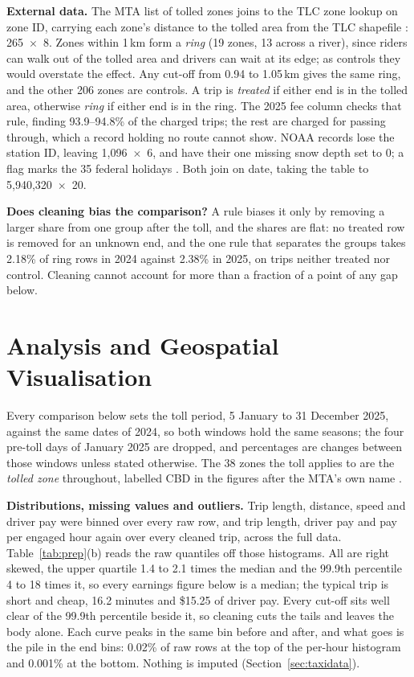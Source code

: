 \documentclass[11pt]{article}
\begin{document}
\textbf{External data.} The MTA list of tolled zones \cite{mtacbdzones} joins to the TLC zone lookup on zone ID, carrying each zone's distance to the tolled area from the TLC shapefile \cite{tlczones}: 265~$\times$~8. Zones within 1\,km form a \emph{ring} (19 zones, 13 across a river), since riders can walk out of the tolled area and drivers can wait at its edge; as controls they would overstate the effect. Any cut-off from 0.94 to 1.05\,km gives the same ring, and the other 206 zones are controls. A trip is \emph{treated} if either end is in the tolled area, otherwise \emph{ring} if either end is in the ring. The 2025 fee column checks that rule, finding 93.9--94.8\% of the charged trips; the rest are charged for passing through, which a record holding no route cannot show. NOAA records \cite{noaaghcnd} lose the station ID, leaving 1,096~$\times$~6, and have their one missing snow depth set to 0; a flag marks the 35 federal holidays \cite{opmholidays}. Both join on date, taking the table to 5,940,320~$\times$~20.

\textbf{Does cleaning bias the comparison?} A rule biases it only by removing a larger share from one group after the toll, and the shares are flat: no treated row is removed for an unknown end, and the one rule that separates the groups takes 2.18\% of ring rows in 2024 against 2.38\% in 2025, on trips neither treated nor control. Cleaning cannot account for more than a fraction of a point of any gap below.

\section{Analysis and Geospatial Visualisation}
\label{sec:analysis}
Every comparison below sets the toll period, 5 January to 31 December 2025, against the same dates of 2024, so both windows hold the same seasons; the four pre-toll days of January 2025 are dropped, and percentages are changes between those windows unless stated otherwise. The 38 zones the toll applies to are the \emph{tolled zone} throughout, labelled CBD in the figures after the MTA's own name \cite{mtacbdzones}.

\textbf{Distributions, missing values and outliers.} Trip length, distance, speed and driver pay were binned over every raw row, and trip length, driver pay and pay per engaged hour again over every cleaned trip, across the full data. Table~\ref{tab:prep}(b) reads the raw quantiles off those histograms. All are right skewed, the upper quartile 1.4 to 2.1 times the median and the 99.9th percentile 4 to 18 times it, so every earnings figure below is a median; the typical trip is short and cheap, 16.2 minutes and \$15.25 of driver pay. Every cut-off sits well clear of the 99.9th percentile beside it, so cleaning cuts the tails and leaves the body alone. Each curve peaks in the same bin before and after, and what goes is the pile in the end bins: 0.02\% of raw rows at the top of the per-hour histogram and 0.001\% at the bottom. Nothing is imputed (Section~\ref{sec:taxidata}).
\end{document}
